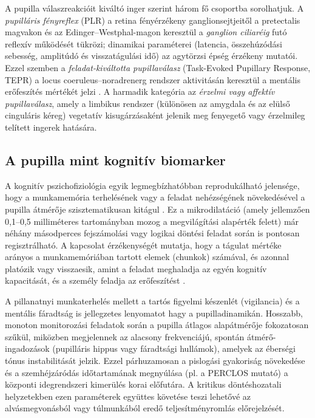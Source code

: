 \documentclass[12pt,a4paper,oneside]{book}
\begin{document}
A pupilla válaszreakcióit kiváltó inger szerint három fő csoportba sorolhatjuk. A \emph{pupilláris fényreflex} (PLR) a retina fényérzékeny ganglionsejtjeitől a pretectalis magvakon és az Edinger--Westphal-magon keresztül a \emph{ganglion ciliaréig} futó reflexív működését tükrözi; dinamikai paraméterei (latencia, összehúzódási sebesség, amplitúdó és visszatágulási idő) az agytörzsi épség érzékeny mutatói. Ezzel szemben a \emph{feladat-kiváltotta pupillaválasz} (Task-Evoked Pupillary Response, TEPR) a locus coeruleus--noradrenerg rendszer aktivitásán keresztül a mentális erőfeszítés mértékét jelzi \cite{beatty1982}. A harmadik kategória az \emph{érzelmi vagy affektív pupillaválasz}, amely a limbikus rendszer (különösen az amygdala és az elülső cinguláris kéreg) vegetatív kisugárzásaként jelenik meg fenyegető vagy érzelmileg telített ingerek hatására.

\subsection{A pupilla mint kognitív biomarker}

A kognitív pszichofiziológia egyik legmegbízhatóbban reprodukálható jelensége, hogy a munkamemória terhelésének vagy a feladat nehézségének növekedésével a pupilla átmérője szisztematikusan kitágul \cite{kahneman1973, beatty1982}. Ez a mikrodilatáció (amely jellemzően 0,1--0,5 milliméteres tartományban mozog a megvilágítási alapérték felett) már néhány másodperces fejszámolási vagy logikai döntési feladat során is pontosan regisztrálható. A kapcsolat érzékenységét mutatja, hogy a tágulat mértéke arányos a munkamemóriában tartott elemek (chunkok) számával, és azonnal platózik vagy visszaesik, amint a feladat meghaladja az egyén kognitív kapacitását, és a személy feladja az erőfeszítést \cite{cowan2010, sweller2011}.

A pillanatnyi munkaterhelés mellett a tartós figyelmi készenlét (vigilancia) és a mentális fáradtság is jellegzetes lenyomatot hagy a pupilladinamikán. Hosszabb, monoton monitorozási feladatok során a pupilla átlagos alapátmérője fokozatosan szűkül, miközben megjelennek az alacsony frekvenciájú, spontán átmérő-ingadozások (pupilláris hippus vagy fáradtsági hullámok), amelyek az éberségi tónus instabilitását jelzik. Ezzel párhuzamosan a pislogási gyakoriság növekedése és a szemhéjzáródás időtartamának megnyúlása (pl. a PERCLOS mutató) a központi idegrendszeri kimerülés korai előfutára. A kritikus döntéshozatali helyzetekben ezen paraméterek együttes követése teszi lehetővé az alvásmegvonásból vagy túlmunkából eredő teljesítményromlás előrejelzését.
\end{document}

